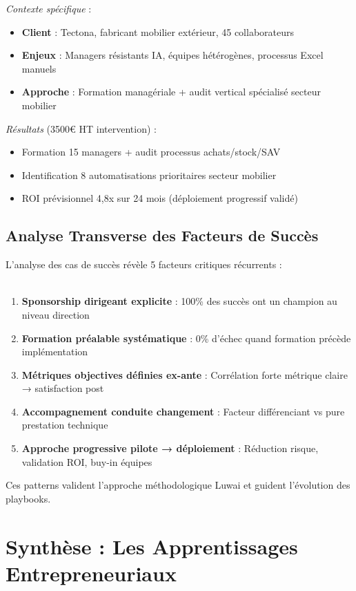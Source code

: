 \emph{Contexte spécifique} \cite{luwai2025tectona} :
\begin{itemize}
    \item \textbf{Client} : Tectona, fabricant mobilier extérieur, 45 collaborateurs
    \item \textbf{Enjeux} : Managers résistants IA, équipes hétérogènes, processus Excel manuels
    \item \textbf{Approche} : Formation managériale + audit vertical spécialisé secteur mobilier
\end{itemize}
\medskip
\emph{Résultats} (3500€ HT intervention) :
\begin{itemize}
    \item Formation 15 managers + audit processus achats/stock/SAV
    \item Identification 8 automatisations prioritaires secteur mobilier
    \item ROI prévisionnel 4,8x sur 24 mois (déploiement progressif validé)
\end{itemize}
\medskip
\subsection{Analyse Transverse des Facteurs de Succès}

L'analyse des cas de succès révèle 5 facteurs critiques récurrents :
\\\\
\begin{enumerate}
    \item \textbf{Sponsorship dirigeant explicite} : 100\% des succès ont un champion au niveau direction
    \item \textbf{Formation préalable systématique} : 0\% d'échec quand formation précède implémentation
    \item \textbf{Métriques objectives définies ex-ante} : Corrélation forte métrique claire → satisfaction post
    \item \textbf{Accompagnement conduite changement} : Facteur différenciant vs pure prestation technique
    \item \textbf{Approche progressive pilote → déploiement} : Réduction risque, validation ROI, buy-in équipes
\end{enumerate}
\medskip
Ces patterns valident l'approche méthodologique Luwai et guident l'évolution des playbooks.

\section{Synthèse : Les Apprentissages Entrepreneuriaux}

